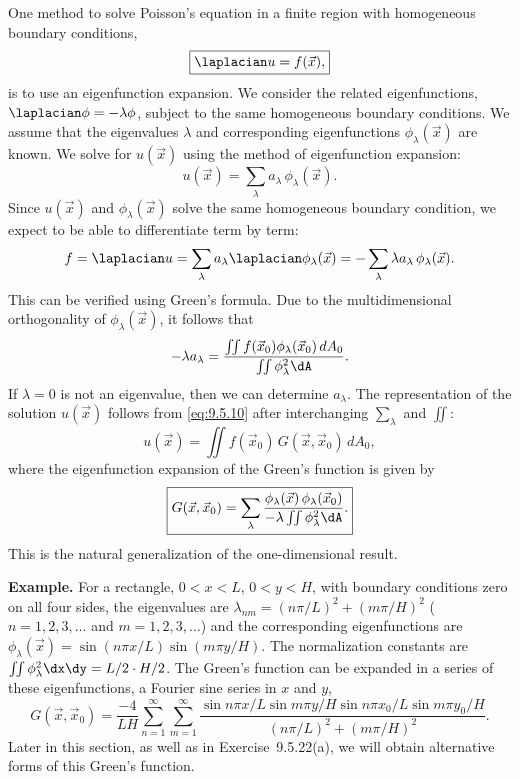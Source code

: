 One method to solve Poisson's equation in a finite region with homogeneous boundary conditions,
\begin{equation}
\label{eq:9.5.9}
\boxed{\laplacian u = f(\vec{x}),}
\end{equation}
is to use an eigenfunction expansion.  We consider the related eigenfunctions, $\laplacian\phi = -\lambda\phi$, subject to the same homogeneous boundary conditions.  We assume that the eigenvalues $\lambda$ and corresponding eigenfunctions $\phi_\lambda(\vec{x})$ are known.  We solve for $u(\vec{x})$ using the method of eigenfunction expansion:
\begin{equation}
\label{eq:9.5.10}
u(\vec{x}) = \sum_\lambda a_\lambda\,\phi_\lambda(\vec{x}).
\end{equation}
Since $u(\vec{x})$ and $\phi_\lambda(\vec{x})$ solve the same homogeneous boundary condition, we expect to be able to differentiate term by term:
\[
f = \laplacian u = \sum_\lambda a_\lambda\laplacian\phi_\lambda(\vec{x}) = -\sum_\lambda \lambda a_\lambda\,\phi_\lambda(\vec{x}).
\]
This can be verified using Green's formula.  Due to the multidimensional orthogonality of $\phi_\lambda(\vec{x})$, it follows that
\begin{equation}
\label{eq:9.5.11}
-\lambda a_\lambda = \frac{\iint f(\vec{x}_0)\phi_\lambda(\vec{x}_0)\,dA_0}{\iint \phi_\lambda^2\dA}.
\end{equation}
If $\lambda = 0$ is not an eigenvalue, then we can determine $a_\lambda$.  The representation of the solution $u(\vec{x})$ follows from \eqref{eq:9.5.10} after interchanging $\sum_\lambda$ and $\iint$:
\begin{equation}
\label{eq:9.5.12}
\boxed{u(\vec{x}) = \iint f(\vec{x}_0)\,G(\vec{x},\vec{x}_0)\,dA_0,}
\end{equation}
where the eigenfunction expansion of the Green's function is given by
\begin{equation}
\label{eq:9.5.13}
\boxed{G(\vec{x},\vec{x}_0) = \sum_\lambda \frac{\phi_\lambda(\vec{x})\,\phi_\lambda(\vec{x}_0)}{-\lambda\iint\phi_\lambda^2\dA}.}
\end{equation}
This is the natural generalization of the one-dimensional result.

\textbf{Example.}
For a rectangle, $0 < x < L$, $0 < y < H$, with boundary conditions zero on all four sides, the eigenvalues are $\lambda_{nm} = (n\pi/L)^2 + (m\pi/H)^2$ ($n = 1,2,3,\ldots$ and $m = 1,2,3,\ldots$) and the corresponding eigenfunctions are $\phi_\lambda(\vec{x}) = \sin(n\pi x/L)\sin(m\pi y/H)$.  The normalization constants are $\iint\phi_\lambda^2\dx\dy = L/2 \cdot H/2$.  The Green's function can be expanded in a series of these eigenfunctions, a Fourier sine series in $x$ and $y$,
\[
G(\vec{x},\vec{x}_0) = \frac{-4}{LH}\sum_{n=1}^{\infty}\sum_{m=1}^{\infty}\frac{\sin n\pi x/L\sin m\pi y/H\sin n\pi x_0/L\sin m\pi y_0/H}{(n\pi/L)^2+(m\pi/H)^2}.
\]
Later in this section, as well as in Exercise~9.5.22(a), we will obtain alternative forms of this Green's function.


